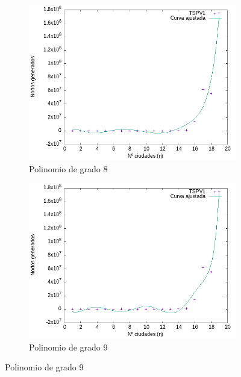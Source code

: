 \documentclass{article}
\begin{document}
\begin{figure}[H]
\begin{subfigure}[b]{0.45\textwidth}
        \centering
        \includegraphics[width=\textwidth]{imagenes/cota1/eficiencia_nodos_bk/CurvaAjustada_n8.png}
        \caption{Polinomio de grado 8}
    \end{subfigure}
    \begin{subfigure}[b]{0.45\textwidth}
        \centering
        \includegraphics[width=\textwidth]{imagenes/cota1/eficiencia_nodos_bk/CurvaAjustada_n9.png}
        \caption{Polinomio de grado 9}
    \end{subfigure}
\end{figure}
\end{document}
